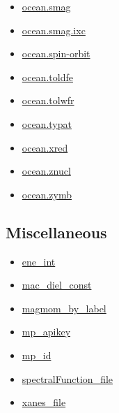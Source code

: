 \documentclass[11pt]{article}
\begin{document}
\begin{itemize}
\item \hyperref[kw:ocean-smag]{ocean.smag}
\item \hyperref[kw:ocean-smag-ixc]{ocean.smag.ixc}
\item \hyperref[kw:ocean-spin-orbit]{ocean.spin-orbit}
\item \hyperref[kw:ocean-toldfe]{ocean.toldfe}
\item \hyperref[kw:ocean-tolwfr]{ocean.tolwfr}
\item \hyperref[kw:ocean-typat]{ocean.typat}
\item \hyperref[kw:ocean-xred]{ocean.xred}
\item \hyperref[kw:ocean-znucl]{ocean.znucl}
\item \hyperref[kw:ocean-zymb]{ocean.zymb}
\end{itemize}

\subsection*{Miscellaneous}
\begin{itemize}
\item \hyperref[kw:ene-int]{ene\_int}
\item \hyperref[kw:mac-diel-const]{mac\_diel\_const}
\item \hyperref[kw:magmom-by-label]{magmom\_by\_label}
\item \hyperref[kw:mp-apikey]{mp\_apikey}
\item \hyperref[kw:mp-id]{mp\_id}
\item \hyperref[kw:spectralFunction-file]{spectralFunction\_file}
\item \hyperref[kw:xanes-file]{xanes\_file}
\end{itemize}
\end{document}
